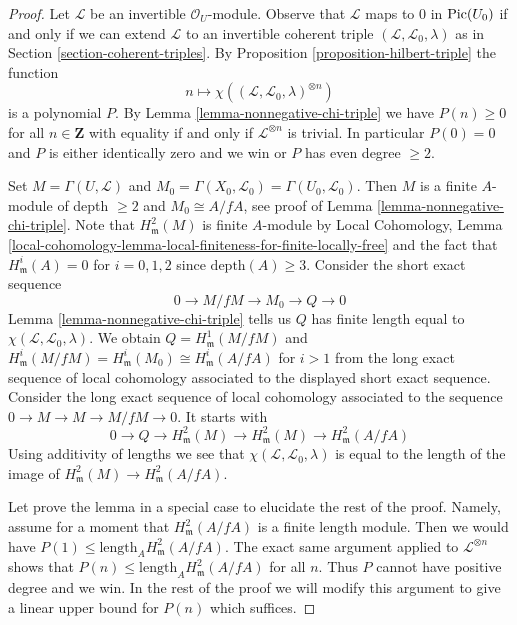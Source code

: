 \begin{proof}
Let $\mathcal{L}$ be an invertible $\mathcal{O}_U$-module.
Observe that $\mathcal{L}$ maps to $0$ in $\mathop{\mathrm{Pic}}\nolimits(U_0)$
if and only if we can extend $\mathcal{L}$ to an invertible
coherent triple $(\mathcal{L}, \mathcal{L}_0, \lambda)$
as in Section \ref{section-coherent-triples}.
By Proposition \ref{proposition-hilbert-triple}
the function
$$
n \longmapsto \chi((\mathcal{L}, \mathcal{L}_0, \lambda)^{\otimes n})
$$
is a polynomial $P$. By Lemma \ref{lemma-nonnegative-chi-triple}
we have
$P(n) \geq 0$ for all $n \in \mathbf{Z}$ with equality if and only if
$\mathcal{L}^{\otimes n}$ is trivial. In particular $P(0) = 0$
and $P$ is either identically zero and we win or $P$ has even degree $\geq 2$.

\medskip\noindent
Set $M = \Gamma(U, \mathcal{L})$ and
$M_0 = \Gamma(X_0, \mathcal{L}_0) = \Gamma(U_0, \mathcal{L}_0)$.
Then $M$ is a finite $A$-module of depth $\geq 2$
and $M_0 \cong A/fA$, see proof of Lemma \ref{lemma-nonnegative-chi-triple}.
Note that $H^2_\mathfrak m(M)$ is finite $A$-module by
Local Cohomology, Lemma
\ref{local-cohomology-lemma-local-finiteness-for-finite-locally-free}
and the fact that $H^i_\mathfrak m(A) = 0$ for $i = 0, 1, 2$
since $\text{depth}(A) \geq 3$.
Consider the short exact sequence
$$
0 \to M/fM \to M_0 \to Q \to 0
$$
Lemma \ref{lemma-nonnegative-chi-triple} tells us $Q$ has finite length
equal to $\chi(\mathcal{L}, \mathcal{L}_0, \lambda)$.
We obtain $Q = H^1_\mathfrak m(M/fM)$ and
$H^i_\mathfrak m(M/fM) = H^i_\mathfrak m(M_0) \cong H^i_\mathfrak m(A/fA)$
for $i > 1$ from the long exact sequence of local cohomology
associated to the displayed short exact sequence. Consider the long
exact sequence of local cohomology associated to the sequence
$0 \to M \to M \to M/fM \to 0$. It starts with
$$
0 \to Q \to H^2_\mathfrak m(M) \to H^2_\mathfrak m(M) \to
H^2_\mathfrak m(A/fA)
$$
Using additivity of lengths we see that
$\chi(\mathcal{L}, \mathcal{L}_0, \lambda)$
is equal to the length of the image of
$H^2_\mathfrak m(M) \to H^2_\mathfrak m(A/fA)$.

\medskip\noindent
Let prove the lemma in a special case to elucidate the rest of the proof.
Namely, assume for a moment that $H^2_\mathfrak m(A/fA)$ is
a finite length module. Then
we would have $P(1) \leq \text{length}_A H^2_\mathfrak m(A/fA)$.
The exact same argument applied to $\mathcal{L}^{\otimes n}$ shows that
$P(n) \leq \text{length}_A H^2_\mathfrak m(A/fA)$ for all $n$.
Thus $P$ cannot have positive degree and we win.
In the rest of the proof we will modify this argument to give
a linear upper bound for $P(n)$ which suffices.


\end{proof}
